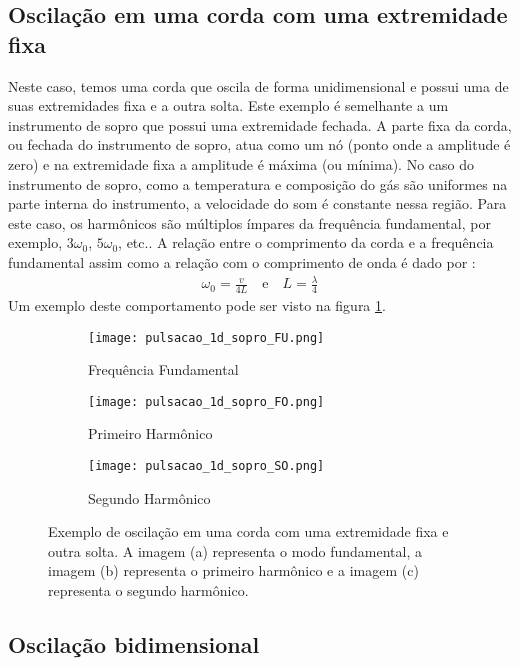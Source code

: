 \subsection{Oscilação em uma corda com uma extremidade fixa}

Neste caso, temos uma corda que oscila de forma unidimensional e possui uma de suas extremidades fixa e a outra solta. Este exemplo é semelhante a um instrumento de sopro que possui uma extremidade fechada. A parte fixa da corda, ou fechada do instrumento de sopro, atua como um nó (ponto onde a amplitude é zero) e na extremidade fixa a amplitude é máxima (ou mínima). No caso do instrumento de sopro, como a temperatura e composição do gás são uniformes na parte interna do instrumento, a velocidade do som é constante nessa região. Para este caso, os harmônicos são múltiplos ímpares da frequência fundamental, por exemplo, $3\omega_0$, $5\omega_0$, etc.. A relação entre o comprimento da corda e a frequência fundamental assim como a relação com o comprimento de onda é dado por \citep{astroseis}:
\begin{align}
\omega_0 = \frac{v}{4L} \quad \text{e} \quad L = \frac{\lambda}{4}
\end{align}
Um exemplo deste comportamento pode ser visto na figura \ref{fig:corda_fixa}.

\begin{figure}[!ht]
\centering
\begin{subfigure}{.33\textwidth}
  \centering
  \texttt{[image: pulsacao\_1d\_sopro\_FU.png]}
  \caption{Frequência Fundamental}
\end{subfigure}%
\begin{subfigure}{.33\textwidth}
  \centering
  \texttt{[image: pulsacao\_1d\_sopro\_FO.png]}
  \caption{Primeiro Harmônico}
\end{subfigure}
\begin{subfigure}{.33\textwidth}
  \centering
  \texttt{[image: pulsacao\_1d\_sopro\_SO.png]}
  \caption{Segundo Harmônico}
\end{subfigure}
\caption[Oscilação em uma corda.]{Exemplo de oscilação em uma corda com uma extremidade fixa e outra solta. A imagem (a) representa o modo fundamental, a imagem (b) representa o primeiro harmônico e a imagem (c) representa o segundo harmônico.}
\label{fig:corda_fixa}
\end{figure}

\subsection{Oscilação bidimensional}

